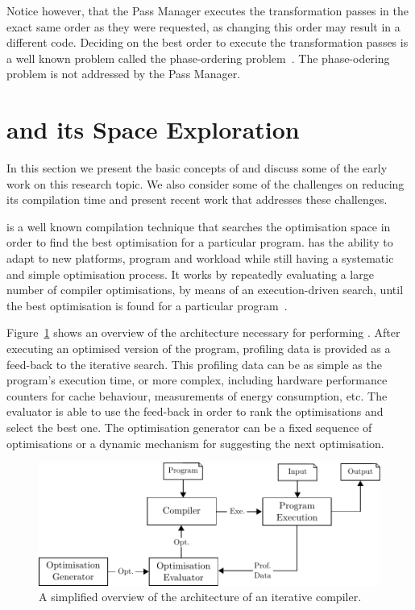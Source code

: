Notice however, that the Pass Manager executes the transformation passes in the exact same order as they were requested, as changing this order may result in a different code.
Deciding on the best order to execute the transformation passes is a well known problem called the phase-ordering problem~\citep{touati06,kulkarni12,jantz14}.
The phase-odering problem is not addressed by the Pass Manager.

\section{{\IterComp} and its Space Exploration}

In this section we present the basic concepts of {\itercomp} and discuss some of the early work on this research topic.
We also consider some of the challenges on reducing its compilation time and present recent work that addresses these challenges.

{\Itercomp} is a well known compilation technique that searches the optimisation space in order to find the best optimisation for a particular program.
{\Itercomp} has the ability to adapt to new platforms, program and workload while still having a systematic and simple optimisation process.
It works by repeatedly evaluating a large number of compiler optimisations, by means of an execution-driven search, until the best optimisation is found for a particular program~\citep{kisuki99,fursin07,chen10}.

Figure~\ref{fig:itercomp-diagram} shows an overview of the architecture necessary for performing {\itercomp}.
After executing an optimised version of the program, profiling data is provided as a feed-back to the iterative search.
This profiling data can be as simple as the program's execution time, or more complex, including hardware performance counters for cache behaviour, measurements of energy consumption, etc.
The evaluator is able to use the feed-back in order to rank the optimisations and select the best one.
The optimisation generator can be a fixed sequence of optimisations or a dynamic mechanism for suggesting the next optimisation.

\begin{figure}[htb]
    \centering
    \includegraphics[width=\linewidth]{figs/itercomp-diagram}
    \caption{A simplified overview of the architecture of an iterative compiler.}
    \label{fig:itercomp-diagram}
\end{figure}

